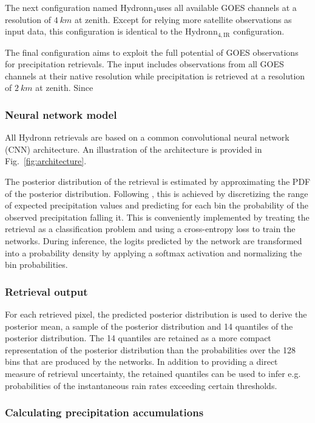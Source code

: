 \documentclass[journal abbreviation, manuscript]{copernicus}
\newcommand{\hydronnfourall}{Hydronn$_{4}$}
\newcommand{\hydronnfourir}{Hydronn$_{4, \text{IR}}$}
\begin{document}
{The next configuration named \hydronnfourall uses all available GOES channels at
a resolution of $4\ \unit{km}$ at zenith. Except for relying  more satellite
observations as input data, this configuration  is identical to the \hydronnfourir
configuration.

The final configuration aims to exploit the full potential of GOES observations
for precipitation retrievals. The input includes observations from all GOES
channels at their native resolution while precipitation is retrieved at a
resolution of $2\ \unit{km}$ at zenith. Since 

\subsubsection{Neural network model}

All Hydronn retrievals are based on a common convolutional neural network
(CNN) architecture. An illustration of the architecture is provided in
Fig.~\ref{fig:architecture}. 

The posterior distribution of the retrieval is estimated by approximating the
PDF of the posterior distribution. Following \citet{metnet}, this is achieved by
discretizing the range of expected precipitation values and predicting for each
bin the probability of the observed precipitation falling it. This is
conveniently implemented by treating the retrieval as a classification problem
and using a cross-entropy loss to train the networks. During inference, the logits
predicted by the network are transformed into a probability density by applying
a softmax activation and normalizing the bin probabilities.

\subsubsection{Retrieval output}

For each retrieved pixel, the predicted posterior distribution is used to derive
the posterior mean, a sample of the posterior distribution and 14 quantiles of
the posterior distribution. The 14 quantiles are retained as a more compact
representation of the posterior distribution than the probabilities over the 128
bins that are produced by the networks. In addition to providing a direct
measure of retrieval uncertainty, the retained quantiles can be used to infer
e.g. probabilities of the instantaneous rain rates exceeding certain thresholds.

\subsubsection{Calculating precipitation accumulations}

}
\end{document}
